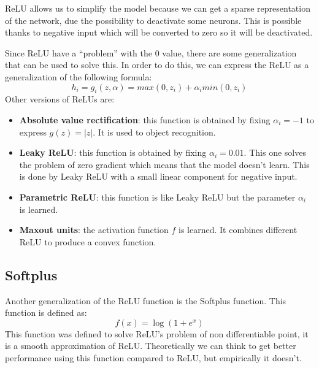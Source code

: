 ReLU allows us to simplify the model because we can get a sparse representation
of the network, due the possibility to deactivate some neurons. This is possible
thanks to negative input which will be converted to zero so it will be deactivated.

Since ReLU have a ``problem'' with the $0$ value, there are some generalization
that can be used to solve this. In order to do this, we can express the ReLU as
a generalization of the following formula:
\begin{equation}
    h_i = g_i(z,\alpha) = max(0,z_i) + \alpha_i min(0, z_i)
\end{equation}
Other versions of ReLUs are:
\begin{itemize}
    \item \textbf{Absolute value rectification}: this function is obtained by
          fixing $\alpha_i = -1$ to express $g(z) = |z|$. It is used to object
          recognition.
    \item \textbf{Leaky ReLU}: this function is obtained by fixing $\alpha_i = 0.01$.
          This one solves the problem of zero gradient which means that the model
          doesn't learn. This is done by Leaky ReLU with a small linear component
          for negative input.
    \item \textbf{Parametric ReLU}: this function is like Leaky ReLU but the
          parameter $\alpha_i$ is learned.
    \item \textbf{Maxout units}: the activation function $f$ is learned. It
          combines different ReLU to produce a convex function.
\end{itemize}
\subsection{Softplus}
Another generalization of the ReLU function is the Softplus function. This function
is defined as:
\begin{equation}
    f(x) = \log(1+e^x)
\end{equation}
This function was defined to solve ReLU's problem of non differentiable point,
it is a smooth approximation of ReLU. Theoretically we can think to get better
performance using this function compared to ReLU, but empirically it doesn't.

